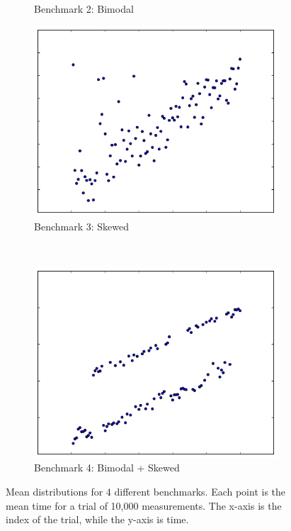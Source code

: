 \documentclass[conference]{IEEEtran}
\begin{document}
\begin{figure}
\begin{subfigure}{0.22\textwidth}
    \caption{Benchmark 2: Bimodal}
\end{subfigure}
\begin{subfigure}{0.22\textwidth}
    \centering
    \includegraphics[width=\textwidth]{figures/fig1/drift_manyallocs_slow}
    \caption{Benchmark 3: Skewed}
\end{subfigure}
~
\begin{subfigure}{0.22\textwidth}
    \centering
    \includegraphics[width=\textwidth]{figures/fig1/bimodal_drift_sumindex}
    \caption{Benchmark 4: Bimodal + Skewed}
\end{subfigure}
\caption{Mean distributions for 4 different benchmarks. Each point is the mean time for a
         trial of 10,000 measurements. The x-axis is the index of the trial, while the
         y-axis is time.}
\label{fig:meandistributions}
\end{figure}
\end{document}
